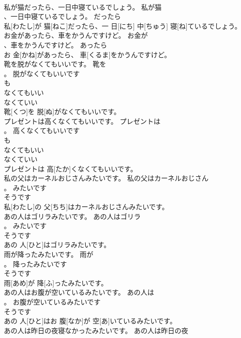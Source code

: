 \documentclass[8pt]{extreport}
\begin{document}
\begin{CJK}{UTF8}{min}
\\	私が猫だったら、一日中寝ているでしょう。	私が猫
\\	、一日中寝ているでしょう。	だったら	
\\	私[わたし]が 猫[ねこ]だったら、一 日[にち] 中[ちゅう] 寝[ね]ているでしょう。	
\\	お金があったら、車をかうんですけど。	お金が
\\	、車をかうんですけど。	あったら	
\\	お 金[かね]があったら、 車[くるま]をかうんですけど。	
\\	靴を脱がなくてもいいです。	靴を
\\	。	脱がなくてもいいです	
\\	も 
\\	なくてもいい 
\\	なくていい 
\\	靴[くつ]を 脱[ぬ]がなくてもいいです。	
\\	プレゼントは高くなくてもいいです。	プレゼントは
\\	。	高くなくてもいいです	
\\	も 
\\	なくてもいい 
\\	なくていい 
\\	プレゼントは 高[たか]くなくてもいいです。	
\\	私の父はカーネルおじさんみたいです。	私の父はカーネルおじさん
\\	。	みたいです	
\\	そうです 
\\	私[わたし]の 父[ちち]はカーネルおじさんみたいです。	
\\	あの人はゴリラみたいです。	あの人はゴリラ
\\	。	みたいです	
\\	そうです 
\\	あの 人[ひと]はゴリラみたいです。	
\\	雨が降ったみたいです。	雨が
\\	。	降ったみたいです	
\\	そうです 
\\	雨[あめ]が 降[ふ]ったみたいです。	
\\	あの人はお腹が空いているみたいです。	あの人は
\\	。	お腹が空いているみたいです	
\\	そうです 
\\	あの 人[ひと]はお 腹[なか]が 空[あ]いているみたいです。	
\\	あの人は昨日の夜寝なかったみたいです。	あの人は昨日の夜

\end{CJK}
\end{document}
